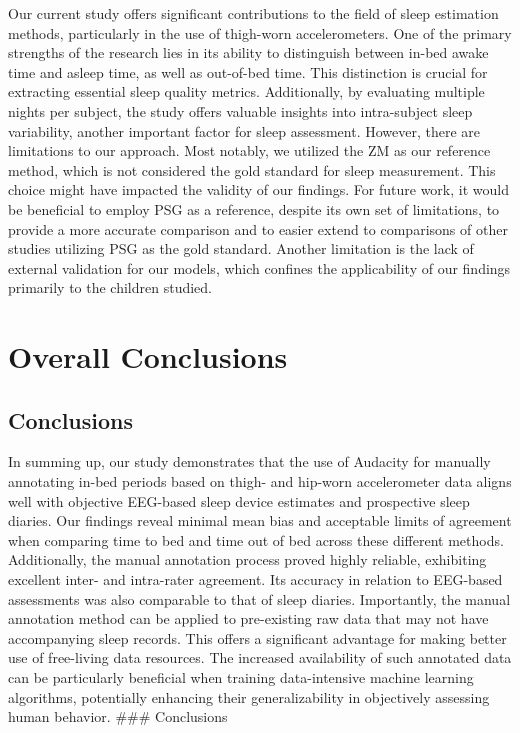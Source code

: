 \documentclass[
  10pt,
]{scrbook}
\begin{document}
Our current study offers significant contributions to the field of sleep
estimation methods, particularly in the use of thigh-worn
accelerometers. One of the primary strengths of the research lies in its
ability to distinguish between in-bed awake time and asleep time, as
well as out-of-bed time. This distinction is crucial for extracting
essential sleep quality metrics. Additionally, by evaluating multiple
nights per subject, the study offers valuable insights into
intra-subject sleep variability, another important factor for sleep
assessment. However, there are limitations to our approach. Most
notably, we utilized the ZM as our reference method, which is not
considered the gold standard for sleep measurement. This choice might
have impacted the validity of our findings. For future work, it would be
beneficial to employ PSG as a reference, despite its own set of
limitations, to provide a more accurate comparison and to easier extend
to comparisons of other studies utilizing PSG as the gold standard.
Another limitation is the lack of external validation for our models,
which confines the applicability of our findings primarily to the
children studied.

\hypertarget{overall-conclusions}{%
\section{Overall Conclusions}\label{overall-conclusions}}

\hypertarget{conclusions}{%
\subsection{Conclusions}\label{conclusions}}

In summing up, our study demonstrates that the use of Audacity for
manually annotating in-bed periods based on thigh- and hip-worn
accelerometer data aligns well with objective EEG-based sleep device
estimates and prospective sleep diaries. Our findings reveal minimal
mean bias and acceptable limits of agreement when comparing time to bed
and time out of bed across these different methods. Additionally, the
manual annotation process proved highly reliable, exhibiting excellent
inter- and intra-rater agreement. Its accuracy in relation to EEG-based
assessments was also comparable to that of sleep diaries. Importantly,
the manual annotation method can be applied to pre-existing raw data
that may not have accompanying sleep records. This offers a significant
advantage for making better use of free-living data resources. The
increased availability of such annotated data can be particularly
beneficial when training data-intensive machine learning algorithms,
potentially enhancing their generalizability in objectively assessing
human behavior. \#\#\# Conclusions
\end{document}
